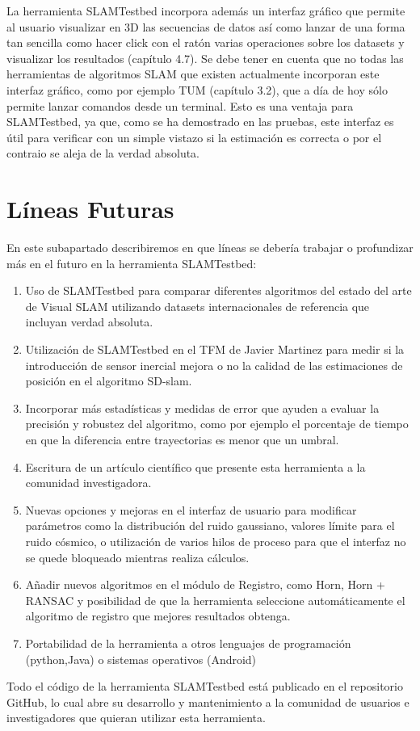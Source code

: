 La herramienta SLAMTestbed incorpora además un interfaz gráfico que permite al usuario visualizar en 3D las secuencias de datos así como lanzar de una forma tan sencilla como hacer click con el ratón varias operaciones sobre los datasets y visualizar los resultados (capítulo 4.7). Se debe tener en cuenta que no todas las herramientas de algoritmos SLAM que existen actualmente incorporan este interfaz gráfico, como por ejemplo TUM (capítulo 3.2), que a día de hoy sólo permite lanzar comandos desde un terminal. Esto es una ventaja para SLAMTestbed, ya que, como se ha demostrado en las pruebas, este interfaz es útil para verificar con un simple vistazo si la estimación es correcta o por el contraio se aleja de la verdad absoluta.


\section{Líneas Futuras}

En este subapartado describiremos en que líneas se debería trabajar o profundizar más en el futuro en la herramienta SLAMTestbed:

\begin{enumerate}

\item{Uso de SLAMTestbed para comparar diferentes algoritmos del estado del arte de Visual SLAM utilizando datasets internacionales de referencia que incluyan verdad absoluta.}

\item{Utilización de SLAMTestbed en el TFM de Javier Martinez para medir si la introducción de sensor inercial mejora o no la calidad de las estimaciones de posición en el algoritmo SD-slam.}

\item{Incorporar más estadísticas y medidas de error que ayuden a evaluar la precisión y robustez del algoritmo, como por ejemplo el porcentaje de tiempo en que la diferencia entre trayectorias es menor que un umbral.}

\item{Escritura de un artículo científico que presente esta herramienta a la comunidad investigadora.}

\item{Nuevas opciones y mejoras en el interfaz de usuario para modificar parámetros como la distribución del ruido gaussiano, valores límite para el ruido cósmico, o utilización de varios hilos de proceso para que el interfaz no se quede bloqueado mientras realiza cálculos.}

\item{Añadir nuevos algoritmos en el módulo de Registro, como Horn, Horn + RANSAC y posibilidad de que la herramienta seleccione automáticamente el algoritmo de registro que 
mejores resultados obtenga.}

\item{Portabilidad de la herramienta a otros lenguajes de programación (python,Java) o sistemas operativos (Android)}

\end{enumerate}

Todo el código de la herramienta SLAMTestbed está publicado en el repositorio GitHub, lo cual abre su desarrollo y mantenimiento a la comunidad de usuarios e investigadores que quieran utilizar esta herramienta.


